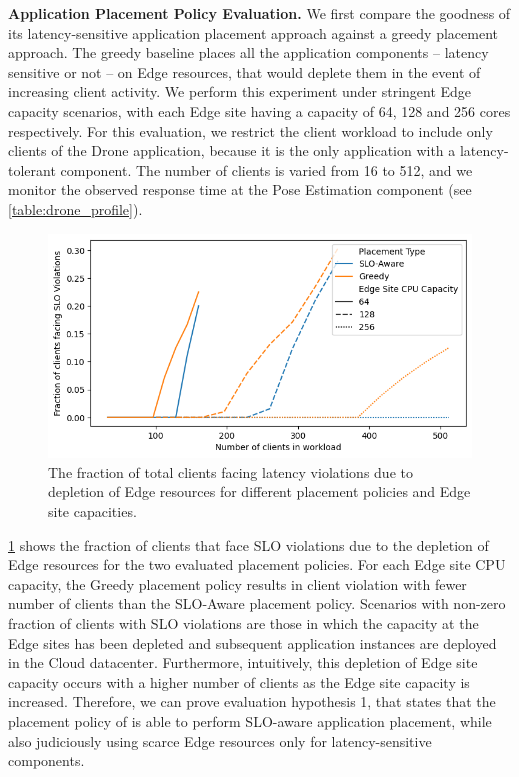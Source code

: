 \par \noindent \textbf{Application Placement Policy Evaluation. }We first compare the goodness of its latency-sensitive application placement approach against a greedy placement approach.  The greedy baseline places all the application components -- latency sensitive or not  -- on Edge resources, that would deplete them in the event of increasing client activity. We perform this experiment under stringent Edge capacity scenarios, with each Edge site having a capacity of 64, 128 and 256 cores respectively. For this evaluation, we restrict the client workload to include only clients of the Drone application, because it is the only application with a latency-tolerant component. The number of clients is varied from 16 to 512, and we monitor the observed response time at the Pose Estimation component (see \cref{table:drone_profile}). 
\begin{figure}[ht]
  \centering
    \includegraphics[width=0.8\columnwidth]{figures/oneedge/violations_wrt_greedy_vs_num_clients.png}
    \caption{The fraction of total clients facing latency violations due to depletion of Edge resources for different placement policies and Edge site capacities.}
    \label{fig:oneedge_placement}
\end{figure}
\cref{fig:oneedge_placement} shows the fraction of clients that face SLO violations due to the depletion of Edge resources for the two evaluated placement policies. For each Edge site CPU capacity, the Greedy placement policy results in client violation with fewer number of clients than the SLO-Aware placement policy. Scenarios with non-zero fraction of clients with SLO violations are those in which the capacity at the Edge sites has been depleted and subsequent application instances are deployed in the Cloud datacenter. Furthermore, intuitively, this depletion of Edge site capacity occurs with a higher number of clients as the Edge site capacity is increased. Therefore, we can prove evaluation hypothesis 1, that states that the placement policy of \oneedge{} is able to perform SLO-aware application placement, while also judiciously using scarce Edge resources only for latency-sensitive components.\\

